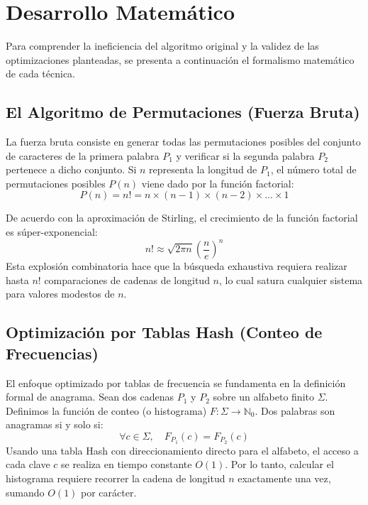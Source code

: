\documentclass[twocolumn]{article}
\begin{document}
\section{Desarrollo Matemático}
Para comprender la ineficiencia del algoritmo original y la validez de las optimizaciones planteadas, se presenta a continuación el formalismo matemático de cada técnica.

\subsection{El Algoritmo de Permutaciones (Fuerza Bruta)}
La fuerza bruta consiste en generar todas las permutaciones posibles del conjunto de caracteres de la primera palabra $P_1$ y verificar si la segunda palabra $P_2$ pertenece a dicho conjunto. Si $n$ representa la longitud de $P_1$, el número total de permutaciones posibles $P(n)$ viene dado por la función factorial:
\begin{equation}
P(n) = n! = n \times (n-1) \times (n-2) \times \dots \times 1
\end{equation}

De acuerdo con la aproximación de Stirling, el crecimiento de la función factorial es súper-exponencial:
\begin{equation}
n! \approx \sqrt{2\pi n} \left(\frac{n}{e}\right)^n
\end{equation}
Esta explosión combinatoria hace que la búsqueda exhaustiva requiera realizar hasta $n!$ comparaciones de cadenas de longitud $n$, lo cual satura cualquier sistema para valores modestos de $n$.

\subsection{Optimización por Tablas Hash (Conteo de Frecuencias)}
El enfoque optimizado por tablas de frecuencia se fundamenta en la definición formal de anagrama. Sean dos cadenas $P_1$ y $P_2$ sobre un alfabeto finito $\Sigma$. Definimos la función de conteo (o histograma) $F: \Sigma \to \mathbb{N}_0$.
Dos palabras son anagramas si y solo si:
\begin{equation}
\forall c \in \Sigma, \quad F_{P_1}(c) = F_{P_2}(c)
\end{equation}
Usando una tabla Hash con direccionamiento directo para el alfabeto, el acceso a cada clave $c$ se realiza en tiempo constante $O(1)$. Por lo tanto, calcular el histograma requiere recorrer la cadena de longitud $n$ exactamente una vez, sumando $O(1)$ por carácter.
\end{document}
